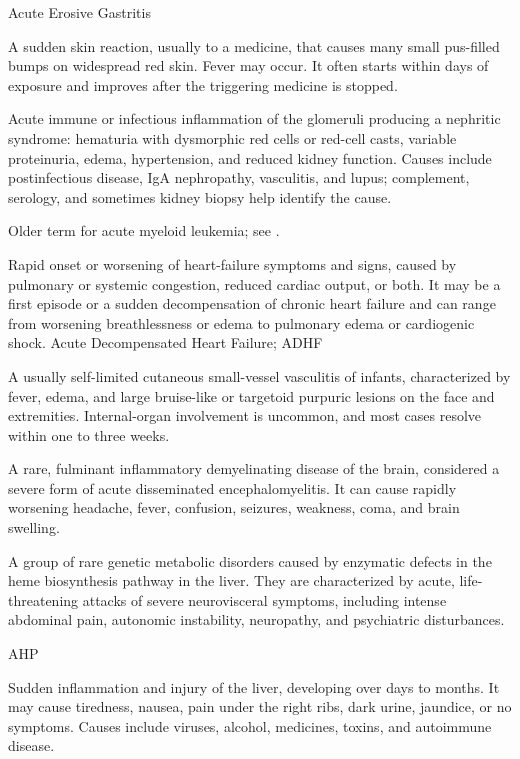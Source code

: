 \synonyms
Acute Erosive Gastritis

 A sudden skin reaction, usually to a medicine, that causes many small pus-filled bumps on widespread red skin. Fever may occur. It often starts within days of exposure and improves after the triggering medicine is stopped.

 Acute immune or infectious inflammation of the glomeruli producing a nephritic syndrome: hematuria with dysmorphic red cells or red-cell casts, variable proteinuria, edema, hypertension, and reduced kidney function. Causes include postinfectious disease, IgA nephropathy, vasculitis, and lupus; complement, serology, and sometimes kidney biopsy help identify the cause.

 Older term for acute myeloid leukemia; see .

 Rapid onset or worsening of heart-failure symptoms and signs, caused by pulmonary or systemic congestion, reduced cardiac output, or both. It may be a first episode or a sudden decompensation of chronic heart failure and can range from worsening breathlessness or edema to pulmonary edema or cardiogenic shock.
\synonyms
Acute Decompensated Heart Failure; ADHF

 A usually self-limited cutaneous small-vessel vasculitis of infants, characterized by fever, edema, and large bruise-like or targetoid purpuric lesions on the face and extremities. Internal-organ involvement is uncommon, and most cases resolve within one to three weeks.

 A rare, fulminant inflammatory demyelinating disease of the brain, considered a severe form of acute disseminated encephalomyelitis. It can cause rapidly worsening headache, fever, confusion, seizures, weakness, coma, and brain swelling.

 A group of rare genetic metabolic disorders caused by enzymatic defects in the heme biosynthesis pathway in the liver. They are characterized by acute, life-threatening attacks of severe neurovisceral symptoms, including intense abdominal pain, autonomic instability, neuropathy, and psychiatric disturbances.

\synonyms
AHP

 Sudden inflammation and injury of the liver, developing over days to months. It may cause tiredness, nausea, pain under the right ribs, dark urine, jaundice, or no symptoms. Causes include viruses, alcohol, medicines, toxins, and autoimmune disease.

